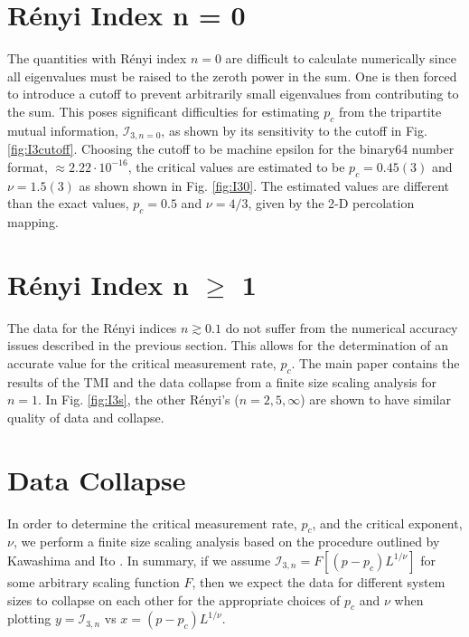 \documentclass[prl,twocolumn,aps,showpacs,amsmath,amssymb,superscriptaddress,floatfix,longbibliography]{revtex4-1}
\begin{document}
\section{R\'enyi Index n = 0}
The quantities with R\'enyi index $n=0$ are difficult to calculate numerically since all eigenvalues must be raised to the zeroth power in the sum. One is then forced to introduce a cutoff to prevent arbitrarily small eigenvalues from contributing to the sum. This poses significant difficulties for estimating $p_c$ from the tripartite mutual information, $\mathcal{I}_{3,n=0}$, as shown by its sensitivity to the cutoff in Fig. \ref{fig:I3cutoff}. Choosing the cutoff to be machine epsilon for the binary64 number format, $\approx 2.22 \cdot 10^{-16}$, the critical values are estimated to be $p_c = 0.45(3)$ and $\nu = 1.5(3)$ as shown shown in Fig. \ref{fig:I30}. The estimated values are different than the exact values, $p_c = 0.5$ and $\nu = 4/3$, given by the 2-D percolation mapping.


\section{R\'enyi Index n $\geq$ 1}
The data for the R\'enyi indices $n \gtrsim 0.1$ do not suffer from the numerical accuracy issues described in the previous section. This allows for the determination of an accurate value for the critical measurement rate, $p_c$. The main paper contains the results of the TMI and the data collapse from a finite size scaling analysis for $n=1$. In Fig. \ref{fig:I3s}, the other R\'enyi's ($n = 2,5,\infty$) are shown to have similar quality of data and collapse.



\section{Data Collapse}
In order to determine the critical measurement rate, $p_c$, and the critical exponent, $\nu$, we perform a finite size scaling analysis based on the procedure outlined by Kawashima and Ito \cite{Ito1993}. In summary, if we assume $\mathcal{I}_{3,n} = F\left[(p-p_c)L^{1/\nu}\right]$ for some arbitrary scaling function $F$, then we expect the data for different system sizes to collapse on each other for the appropriate choices of $p_c$ and $\nu$ when plotting $y = \mathcal{I}_{3,n}$ vs $x = (p-p_c)L^{1/\nu}$.
\end{document}
